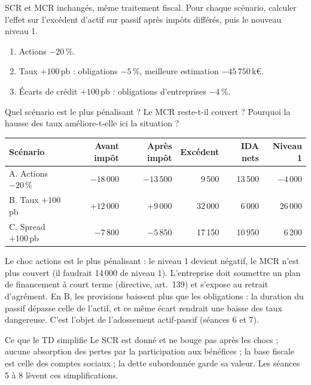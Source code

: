 \documentclass[11pt,a4paper]{article}
\newcommand{\keur}{\,k\euro}
\begin{document}
\begin{exercice}
SCR et MCR inchangés, même traitement fiscal. Pour chaque scénario, calculer l'effet sur
l'excédent d'actif sur passif après impôts différés, puis le nouveau niveau 1.
\begin{enumerate}[nosep]
  \item[A.] Actions $-20\,\%$.
  \item[B.] Taux $+100$\,pb : obligations $-5\,\%$, meilleure estimation $-45\,750$\keur.
  \item[C.] Écarts de crédit $+100$\,pb : obligations d'entreprises $-4\,\%$.
\end{enumerate}
Quel scénario est le plus pénalisant ? Le MCR reste-t-il couvert ? Pourquoi la hausse des taux
améliore-t-elle ici la situation ?
\end{exercice}
\begin{corrige}
\begin{center}
\begin{tabular}{lrrrrr}
\toprule
Scénario & Avant impôt & Après impôt & Excédent & IDA nets & Niveau 1 \\
\midrule
A. Actions $-20\,\%$   & $-18\,000$ & $-13\,500$ &  9\,500 & 13\,500 & $-4\,000$ \\
B. Taux $+100$\,pb      & $+12\,000$ &  $+9\,000$ & 32\,000 &  6\,000 & 26\,000 \\
C. Spread $+100$\,pb    &  $-7\,800$ &  $-5\,850$ & 17\,150 & 10\,950 &  6\,200 \\
\bottomrule
\end{tabular}
\end{center}
Le choc actions est le plus pénalisant : le niveau 1 devient négatif, le MCR n'est plus couvert
(il faudrait 14\,000 de niveau 1). L'entreprise doit soumettre un plan de financement à court
terme (directive, art.~139) et s'expose au retrait d'agrément. En B, les provisions baissent plus
que les obligations : la duration du passif dépasse celle de l'actif, et ce même écart rendrait
une baisse des taux dangereuse. C'est l'objet de l'adossement actif-passif (séances 6 et 7).
\end{corrige}

\begin{generalisation}{Ce que le TD simplifie}
Le SCR est donné et ne bouge pas après les chocs ; aucune absorption des pertes par la
participation aux bénéfices ; la base fiscale est celle des comptes sociaux ; la dette subordonnée
garde sa valeur. Les séances 5 à 8 lèvent ces simplifications.
\end{generalisation}
\end{document}
